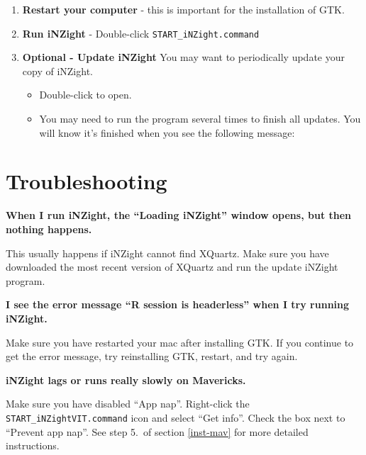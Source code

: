 \documentclass[10pt,a4paper,twoside]{article}
\begin{document}
\begin{enumerate}
\item \textbf{Restart your computer} - this is important for the installation of GTK.

\item \textbf{Run iNZight} - Double-click \verb+START_iNZight.command+


\item \textbf{Optional - Update iNZight}
  You may want to periodically update your copy of iNZight.

  \begin{itemize}
  \item Double-click to open.

  \item You may need to run the program several times to finish all updates. You will know
    it's finished when you see the following message:
  \end{itemize}
 
\end{enumerate}



\vfill\pagebreak
\section{Troubleshooting}
\setlength{\parindent}{0pt}

\textbf{When I run iNZight, the ``Loading iNZight'' window opens, but then nothing happens.}

This usually happens if iNZight cannot find XQuartz. Make sure you have downloaded the
most recent version of XQuartz and run the update iNZight program.


\vspace{1em}
\textbf{I see the error message ``R session is headerless'' when I try running iNZight.}

Make sure you have restarted your mac after installing GTK. If you continue to get the
error message, try reinstalling GTK, restart, and try again.


\vspace{1em}
\textbf{iNZight lags or runs really slowly on Mavericks.}

Make sure you have disabled ``App nap''. Right-click the \verb+START_iNZightVIT.command+
icon and select ``Get info''. Check the box next to ``Prevent app nap''. See step 5.\ of
section \ref{inst-mav} for more detailed instructions.
\end{document}
